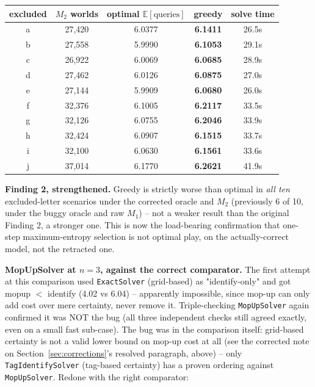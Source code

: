 \documentclass[11pt]{article}
\begin{document}
\begin{center}
\begin{tabular}{ccccc}
\toprule
excluded & $M_2$ worlds & optimal $\mathbb{E}[\text{queries}]$ & greedy & solve time \\
\midrule
a & 27{,}420 & 6.0377 & \textbf{6.1411} & 26.5s \\
b & 27{,}558 & 5.9990 & \textbf{6.1053} & 29.1s \\
c & 26{,}922 & 6.0069 & \textbf{6.0685} & 28.9s \\
d & 27{,}462 & 6.0126 & \textbf{6.0875} & 27.0s \\
e & 27{,}144 & 5.9909 & \textbf{6.0680} & 26.0s \\
f & 32{,}376 & 6.1005 & \textbf{6.2117} & 33.5s \\
g & 32{,}126 & 6.0755 & \textbf{6.2046} & 33.9s \\
h & 32{,}424 & 6.0907 & \textbf{6.1515} & 33.7s \\
i & 32{,}100 & 6.0630 & \textbf{6.1561} & 33.6s \\
j & 37{,}014 & 6.1770 & \textbf{6.2621} & 41.9s \\
\bottomrule
\end{tabular}
\end{center}

\textbf{Finding 2, strengthened.} Greedy is strictly worse than optimal in
\emph{all ten} excluded-letter scenarios under the corrected oracle and
$M_2$ (previously 6 of 10, under the buggy oracle and raw $M_1$) -- not a
weaker result than the original Finding 2, a stronger one. This is now
the load-bearing confirmation that one-step maximum-entropy selection is
not optimal play, on the actually-correct model, not the retracted one.

\textbf{MopUpSolver at $n=3$, against the correct comparator.} The first
attempt at this comparison used \texttt{ExactSolver} (grid-based) as
"identify-only" and got mopup $<$ identify (4.02 vs 6.04) -- apparently
impossible, since mop-up can only add cost over mere certainty, never
remove it. Triple-checking \texttt{MopUpSolver} again confirmed it was NOT
the bug (all three independent checks still agreed exactly, even on a
small fast sub-case). The bug was in the comparison itself: grid-based
certainty is not a valid lower bound on mop-up cost at all (see the
corrected note on Section~\ref{sec:corrections}'s resolved paragraph,
above) -- only \texttt{TagIdentifySolver} (tag-based certainty) has a
proven ordering against \texttt{MopUpSolver}. Redone with the right
comparator:
\end{document}
